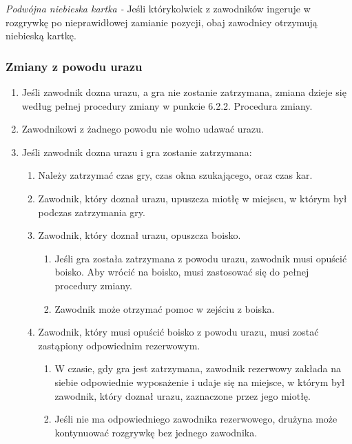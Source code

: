 \documentclass[12pt]{article}
\begin{document}
\emph{Podwójna niebieska kartka -} Jeśli którykolwiek z zawodników
ingeruje w rozgrywkę po nieprawidłowej zamianie pozycji, obaj zawodnicy
otrzymują niebieską kartkę.

\subsubsection{Zmiany z powodu urazu}

\begin{enumerate}
\item
  Jeśli zawodnik dozna urazu, a gra nie zostanie zatrzymana, zmiana
  dzieje się według pełnej procedury zmiany w punkcie 6.2.2. Procedura
  zmiany.
\item
  Zawodnikowi z żadnego powodu nie wolno udawać urazu.
\item
  Jeśli zawodnik dozna urazu i gra zostanie zatrzymana:

  \begin{enumerate}
  \item
        Należy zatrzymać czas gry, czas okna szukającego, oraz czas kar.
      \item
        Zawodnik, który doznał urazu, upuszcza miotłę w miejscu, w którym
    był podczas zatrzymania gry.
      \item
        Zawodnik, który doznał urazu, opuszcza boisko.
    
    \begin{enumerate}
    \item
            Jeśli gra została zatrzymana z powodu urazu, zawodnik musi opuścić
      boisko. Aby wrócić na boisko, musi zastosować się do pełnej
      procedury zmiany.
          \item
            Zawodnik może otrzymać pomoc w zejściu z boiska.
          \end{enumerate}
  \item
        Zawodnik, który musi opuścić boisko z powodu urazu, musi zostać
    zastąpiony odpowiednim rezerwowym.
    
    \begin{enumerate}
    \item
            W czasie, gdy gra jest zatrzymana, zawodnik rezerwowy zakłada na
      siebie odpowiednie wyposażenie i udaje się na miejsce, w którym
      był zawodnik, który doznał urazu, zaznaczone przez jego miotłę.
          \item
            Jeśli nie ma odpowiedniego zawodnika rezerwowego, drużyna może
      kontynuować rozgrywkę bez jednego zawodnika.
          \end{enumerate}
  \end{enumerate}
\end{enumerate}
\end{document}
